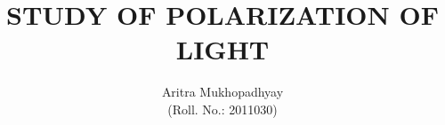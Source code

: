 \documentclass[10pt]{article}
\title{\textbf{STUDY OF POLARIZATION OF LIGHT}}
\author{Aritra Mukhopadhyay\\(Roll. No.: 2011030)}
\date{}
\begin{document}
    \maketitle
    
    \begin{multicols*}{2}
        
        
        
        

        
        
        \nocite{*}
    \end{multicols*}
\end{document}
